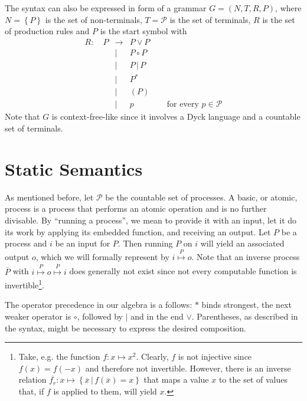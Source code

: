 The syntax can also be expressed in form of a grammar $G = \left( N, T, R, P \right)$, where $N = \left\{ P \right\}$ is the set of non-terminals, $T = \mathcal{P}$ is the set of terminals, $R$ is the set of production rules and $P$ is the start symbol \cite{Hopcroft:2006:IAT:1196416} with %
\begin{eqnarray*}
  R \colon \quad P & \to & P \vee P \\
    & | & P \circ P \\
    & | & P \,|\, P \\
    & | & P^* \\
    & | & \left( P \right) \\
    & | & p \quad\quad\quad\quad \text{for every } p \in \mathcal{P}
\end{eqnarray*}
Note that $G$ is context-free-like since it involves a Dyck language \cite{} and a countable set of terminals.

\section{Static Semantics}
As mentioned before, let $\mathcal{P}$ be the countable set of processes. A basic, or atomic, process is a process that performs an atomic operation and is no further divisable. By \enquote{running a process}, we mean to provide it with an input, let it do its work by applying its embedded function, and receiving an output. Let $P$ be a process and $i$ be an input for $P$. Then running $P$ on $i$ will yield an associated output $o$, which we will formally represent by $i \overset{P}{\mapsto} o$. Note that an inverse process $\overline{P}$ with $i \overset{P}{\mapsto} o \overset{\overline{P}}{\mapsto} i$ does generally not exist since not every computable function is invertible\footnote{Take, e.g. the function $f \colon x \mapsto x^2$. Clearly, $f$ is not injective since $f \left( x \right) = f \left( -x \right)$ and therefore not invertible. However, there is an inverse relation $\overline{f_r} \colon x \mapsto \left\{ \overline{x} \,|\, f \left( \overline{x} \right) = x \right\}$ that maps a value $x$ to the set of values that, if $f$ is applied to them, will yield $x$.}.

The operator precedence in our algebra is a follows: $*$ binds strongest, the next weaker operator is $\circ$, followed by $|$ and in the end $\vee$. Parentheses, as described in the syntax, might be necessary to express the desired composition.

